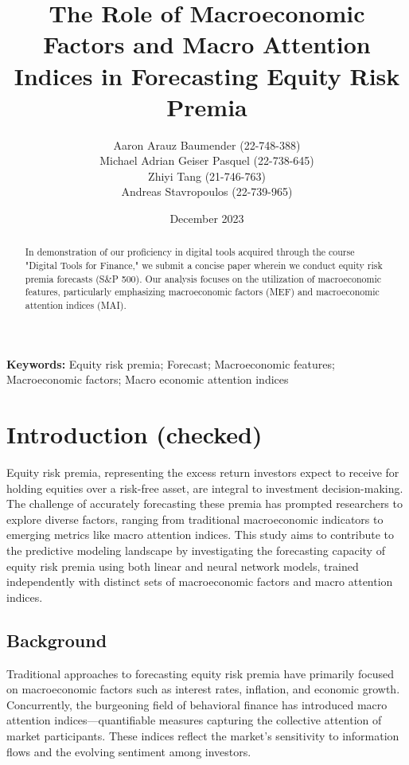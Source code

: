 \documentclass{article}
\title{The Role of Macroeconomic Factors and Macro Attention Indices in Forecasting Equity Risk Premia}
\author{Aaron Arauz Baumender (22-748-388) 
\\  Michael Adrian Geiser Pasquel (22-738-645) 
\\ Zhiyi Tang (21-746-763) 
\\ Andreas Stavropoulos (22-739-965)}
\affil{University of Zurich}
\date{December 2023}
\providecommand{\keywords}[1]{\small \textbf{Keywords:} #1}
\begin{document}
\maketitle

\begin{abstract} 
\noindent In demonstration of our proficiency in digital tools acquired through the course "Digital Tools for Finance," we submit a concise paper wherein we conduct equity risk premia forecasts (S\&P 500). Our analysis focuses on the utilization of macroeconomic features, particularly emphasizing macroeconomic factors (MEF) and macroeconomic attention indices (MAI).
\end{abstract}

\hfill

\noindent \keywords{Equity risk premia; Forecast; Macroeconomic features; Macroeconomic factors; Macro economic attention indices}\\


\newpage

\tableofcontents

\newpage


\section{Introduction (checked)}

Equity risk premia, representing the excess return investors expect to receive for holding equities over a risk-free asset, are integral to investment decision-making. The challenge of accurately forecasting these premia has prompted researchers to explore diverse factors, ranging from traditional macroeconomic indicators to emerging metrics like macro attention indices. This study aims to contribute to the predictive modeling landscape by investigating the forecasting capacity of equity risk premia using both linear and neural network models, trained independently with distinct sets of macroeconomic factors and macro attention indices.

\subsection{Background}

Traditional approaches to forecasting equity risk premia have primarily focused on macroeconomic factors such as interest rates, inflation, and economic growth. Concurrently, the burgeoning field of behavioral finance has introduced macro attention indices—quantifiable measures capturing the collective attention of market participants. These indices reflect the market's sensitivity to information flows and the evolving sentiment among investors.
\end{document}
